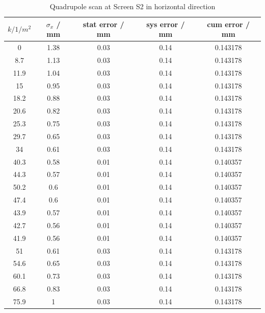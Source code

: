 \documentclass[11pt,a4paper,notitlepage]{scrartcl}
\begin{document}
\begin{table}[htbp]
		\centering
	\begin{tabular}{c|c|c|c|c}
		$k / 1/m^2$ & $\sigma_x$ / mm & stat error / mm & sys error / mm & cum error / mm \\
		\hline
		\hline
		0    & 1.38 & 0.03 & 0.14 & 0.143178 \\
		8.7  & 1.13 & 0.03 & 0.14 & 0.143178 \\
		11.9 & 1.04 & 0.03 & 0.14 & 0.143178 \\
		15   & 0.95 & 0.03 & 0.14 & 0.143178 \\
		18.2 & 0.88 & 0.03 & 0.14 & 0.143178 \\
		20.6 & 0.82 & 0.03 & 0.14 & 0.143178 \\
		25.3 & 0.75 & 0.03 & 0.14 & 0.143178 \\
		29.7 & 0.65 & 0.03 & 0.14 & 0.143178 \\
		34   & 0.61 & 0.03 & 0.14 & 0.143178 \\
		40.3 & 0.58 & 0.01 & 0.14 & 0.140357 \\
		44.3 & 0.57 & 0.01 & 0.14 & 0.140357 \\
		50.2 & 0.6  & 0.01 & 0.14 & 0.140357 \\
		47.4 & 0.6  & 0.01 & 0.14 & 0.140357 \\
		43.9 & 0.57 & 0.01 & 0.14 & 0.140357 \\
		42.7 & 0.56 & 0.01 & 0.14 & 0.140357 \\
		41.9 & 0.56 & 0.01 & 0.14 & 0.140357 \\
		51   & 0.61 & 0.03 & 0.14 & 0.143178 \\
		54.6 & 0.65 & 0.03 & 0.14 & 0.143178 \\
		60.1 & 0.73 & 0.03 & 0.14 & 0.143178 \\
		66.8 & 0.83 & 0.03 & 0.14 & 0.143178 \\
		75.9 & 1    & 0.03 & 0.14 & 0.143178
	\end{tabular}
\caption{Quadrupole scan at Screen S2 in horizontal direction}
\label{tab:qscan2x}
\end{table}
\end{document}
